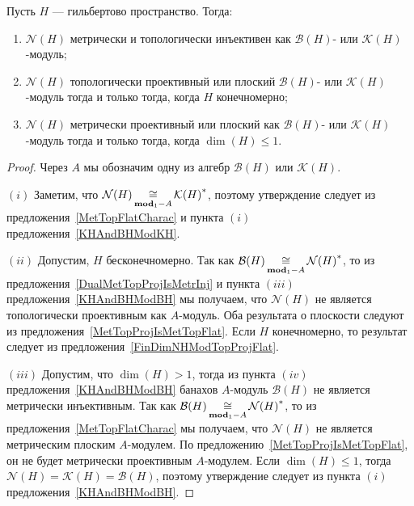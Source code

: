\begin{proposition}\label{KHAndBHModNH} Пусть $H$ --- гильбертово пространство.
Тогда:

\begin{enumerate}[label = (\roman*)]
    \item $\mathcal{N}(H)$ метрически и топологически инъективен как
    $\mathcal{B}(H)$- или $\mathcal{K}(H)$-модуль;

    \item $\mathcal{N}(H)$ топологически проективный или плоский 
    $\mathcal{B}(H)$- или $\mathcal{K}(H)$-модуль тогда и 
    только тогда, когда $H$ конечномерно;

    \item $\mathcal{N}(H)$ метрически проективный или плоский 
    как $\mathcal{B}(H)$- или $\mathcal{K}(H)$-модуль тогда и 
    только тогда, когда $\dim(H)\leq 1$.
\end{enumerate}
\end{proposition}
\begin{proof} Через $A$ мы обозначим одну из алгебр $\mathcal{B}(H)$ или
$\mathcal{K}(H)$.

$(i)$ Заметим, что $\mathcal{N}(H)\mathop{\mathbin{\cong}}\limits_{\mathbf{mod}_1-A}{\mathcal{K}(H)}^*$,
поэтому утверждение следует из предложения~\ref{MetTopFlatCharac} и пункта $(i)$
предложения~\ref{KHAndBHModKH}.

$(ii)$ Допустим, $H$ бесконечномерно. Так как
$\mathcal{B}(H)\mathop{\mathbin{\cong}}\limits_{\mathbf{mod}_1-A}{\mathcal{N}(H)}^*$, то из
предложения~\ref{DualMetTopProjIsMetrInj} и пункта $(iii)$
предложения~\ref{KHAndBHModBH} мы получаем, что $\mathcal{N}(H)$ не является
топологически проективным как $A$-модуль. Оба результата о плоскости следуют из
предложения~\ref{MetTopProjIsMetTopFlat}. Если $H$ конечномерно, то результат
следует из предложения~\ref{FinDimNHModTopProjFlat}.

$(iii)$ Допустим, что $\dim(H)>1$, тогда из пункта $(iv)$
предложения~\ref{KHAndBHModBH} банахов $A$-модуль $\mathcal{B}(H)$ не является
метрически инъективным. Так как
$\mathcal{B}(H)\mathop{\mathbin{\cong}}\limits_{\mathbf{mod}_1-A}{\mathcal{N}(H)}^*$, то из
предложения~\ref{MetTopFlatCharac} мы получаем, что $\mathcal{N}(H)$ не является
метрическим плоским $A$-модулем. По предложению~\ref{MetTopProjIsMetTopFlat}, он
не будет метрически проективным $A$-модулем. Если $\dim(H)\leq 1$, тогда
$\mathcal{N}(H)=\mathcal{K}(H)=\mathcal{B}(H)$, поэтому утверждение следует из
пункта $(i)$ предложения~\ref{KHAndBHModBH}.
\end{proof}

